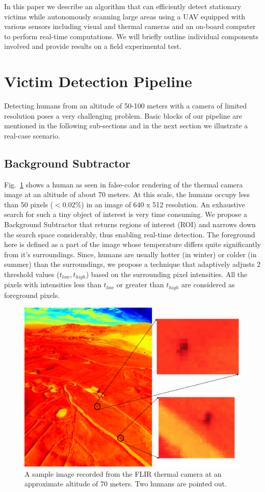 \documentclass[runningheads]{llncs}
\begin{document}
In this paper we describe an algorithm that can efficiently detect stationary victims while autonomously scanning large areas using a UAV equipped with various sensors including visual and thermal cameras and an on-board computer to perform real-time computations. We will briefly outline individual components involved and provide results on a field experimental test.

\section{Victim Detection Pipeline}
Detecting humans from an altitude of 50-100 meters with a camera of limited resolution poses a very challenging problem. Basic blocks of our pipeline are mentioned in the following sub-sections and in the next section we illustrate a real-case scenario.

\subsection{Background Subtractor}
Fig.~\ref{fig:thermal_sample} shows a human as seen in false-color rendering of the thermal camera image at an altitude of about 70 meters. At this scale, the humans occupy less than 50 pixels ($<$0.02\%) in an image of 640 x 512 resolution. An exhaustive search for such a tiny object of interest is very time consuming. We propose a Background Subtractor that returns regions of interest (ROI) and narrows down the search space considerably, thus enabling real-time detection. The foreground here is defined as a part of the image whose temperature differs quite significantly from it's surroundings. Since, humans are usually hotter (in winter) or colder (in summer) than the surroundings, we propose a technique that adaptively adjusts 2 threshold values ($t_{low}, t_{high}$) based on the surrounding pixel intensities. All the pixels with intensities less than $t_{low}$ or greater than $t_{high}$ are considered as foreground pixels.

\begin{figure}
\centerline{\includegraphics[scale=0.3]{img/sample_thermal.png}}
\caption{A sample image recorded from the FLIR thermal camera at an approximate altitude of 70 meters. Two humans are pointed out.}
\label{fig:thermal_sample}
\end{figure}
\end{document}
